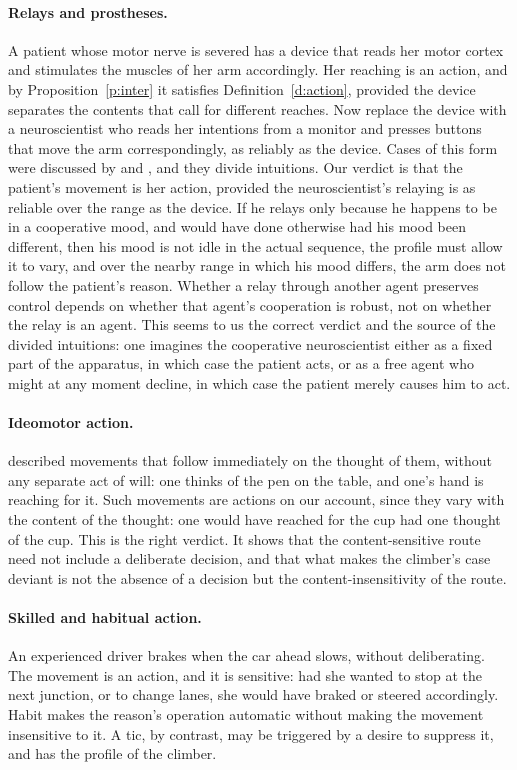 \documentclass{situationist-preprint}
\begin{document}
\paragraph{Relays and prostheses.} A patient whose motor nerve is severed has a device that reads her motor cortex and stimulates the muscles of her arm accordingly. Her reaching is an action, and by Proposition~\ref{p:inter} it satisfies Definition~\ref{d:action}, provided the device separates the contents that call for different reaches. Now replace the device with a neuroscientist who reads her intentions from a monitor and presses buttons that move the arm correspondingly, as reliably as the device. Cases of this form were discussed by \citet{Peacocke1979} and \citet{Bishop1989}, and they divide intuitions. Our verdict is that the patient's movement is her action, provided the neuroscientist's relaying is as reliable over the range as the device. If he relays only because he happens to be in a cooperative mood, and would have done otherwise had his mood been different, then his mood is not idle in the actual sequence, the profile must allow it to vary, and over the nearby range in which his mood differs, the arm does not follow the patient's reason. Whether a relay through another agent preserves control depends on whether that agent's cooperation is robust, not on whether the relay is an agent. This seems to us the correct verdict and the source of the divided intuitions: one imagines the cooperative neuroscientist either as a fixed part of the apparatus, in which case the patient acts, or as a free agent who might at any moment decline, in which case the patient merely causes him to act.

\paragraph{Ideomotor action.} \citet[ch.~26]{James1890} described movements that follow immediately on the thought of them, without any separate act of will: one thinks of the pen on the table, and one's hand is reaching for it. Such movements are actions on our account, since they vary with the content of the thought: one would have reached for the cup had one thought of the cup. This is the right verdict. It shows that the content-sensitive route need not include a deliberate decision, and that what makes the climber's case deviant is not the absence of a decision but the content-insensitivity of the route.

\paragraph{Skilled and habitual action.} An experienced driver brakes when the car ahead slows, without deliberating. The movement is an action, and it is sensitive: had she wanted to stop at the next junction, or to change lanes, she would have braked or steered accordingly. Habit makes the reason's operation automatic without making the movement insensitive to it. A tic, by contrast, may be triggered by a desire to suppress it, and has the profile of the climber.
\end{document}
